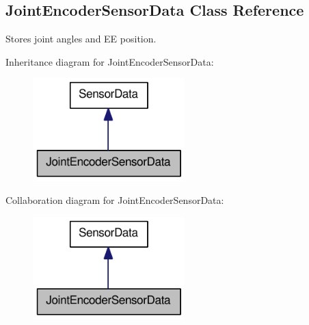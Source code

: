 \hypertarget{classOpenRAVE_1_1SensorBase_1_1JointEncoderSensorData}{
\subsection{JointEncoderSensorData Class Reference}
\label{classOpenRAVE_1_1SensorBase_1_1JointEncoderSensorData}
}


Stores joint angles and EE position.  




Inheritance diagram for JointEncoderSensorData:\nopagebreak
\begin{figure}[H]
\begin{center}
\leavevmode
\includegraphics[width=166pt]{classOpenRAVE_1_1SensorBase_1_1JointEncoderSensorData__inherit__graph}
\end{center}
\end{figure}


Collaboration diagram for JointEncoderSensorData:\nopagebreak
\begin{figure}[H]
\begin{center}
\leavevmode
\includegraphics[width=166pt]{classOpenRAVE_1_1SensorBase_1_1JointEncoderSensorData__coll__graph}
\end{center}
\end{figure}
